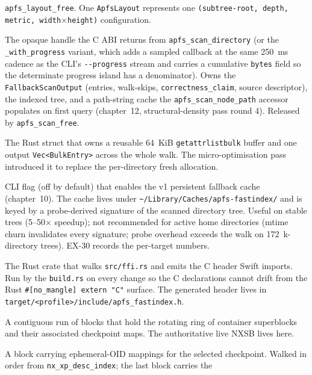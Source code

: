 \begin{description}
    \texttt{apfs\_layout\_free}. One \texttt{ApfsLayout}
    represents one \texttt{(subtree-root, depth, metric,
    width$\times$height)} configuration.
  \item[\texttt{ApfsScan}.] The opaque handle the C ABI returns
    from \texttt{apfs\_scan\_directory} (or the
    \texttt{\_with\_progress} variant, which adds a sampled
    callback at the same 250~ms cadence as the CLI's
    \texttt{-{}-progress} stream and carries a cumulative
    \texttt{bytes} field so the determinate progress island has a
    denominator). Owns the \texttt{FallbackScanOutput} (entries,
    walk-skips, \texttt{correctness\_claim}, source descriptor),
    the indexed tree, and a path-string cache the
    \texttt{apfs\_scan\_node\_path} accessor populates on first
    query (chapter~12, structural-density pass round 4). Released
    by \texttt{apfs\_scan\_free}.
  \item[\texttt{BulkReader}.] The Rust struct that owns a
    reusable 64~KiB \texttt{getattrlistbulk} buffer and one output
    \texttt{Vec<BulkEntry>} across the whole walk. The
    micro-optimisation pass introduced it to replace the
    per-directory fresh allocation.
  \item[\texttt{-{}-cache}.] CLI flag (off by default) that
    enables the v1 persistent fallback cache (chapter~10). The
    cache lives under
    \texttt{\textasciitilde/Library/Caches/apfs-fastindex/} and
    is keyed by a probe-derived signature of the scanned
    directory tree. Useful on stable trees (5--50$\times$
    speedup); not recommended for active home directories
    (mtime churn invalidates every signature; probe overhead
    exceeds the walk on 172~k-directory trees). EX-30 records
    the per-target numbers.
  \item[\texttt{cbindgen}.] The Rust crate that walks
    \texttt{src/ffi.rs} and emits the C header Swift imports. Run
    by the \texttt{build.rs} on every change so the C declarations
    cannot drift from the Rust \texttt{\#[no\_mangle] extern "C"}
    surface. The generated header lives in
    \texttt{target/<profile>/include/apfs\_fastindex.h}.
  \item[Checkpoint descriptor area.] A contiguous run of blocks
    that hold the rotating ring of container superblocks and
    their associated checkpoint maps. The authoritative live NXSB
    lives here.
  \item[Checkpoint map.] A block carrying ephemeral-OID mappings
    for the selected checkpoint. Walked in order from
    \texttt{nx\_xp\_desc\_index}; the last block carries the

\end{description}
